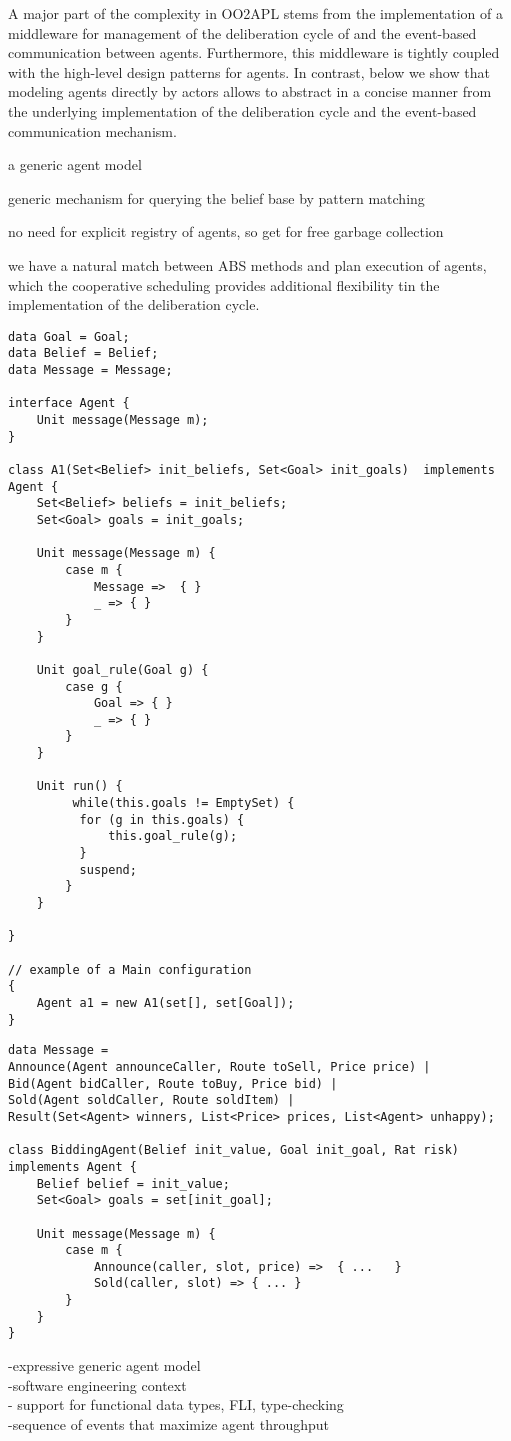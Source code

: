 A major part of the complexity in OO2APL stems from the implementation of a middleware for management of the deliberation cycle of and the event-based communication between agents. 
Furthermore, this middleware is tightly coupled with the high-level design patterns for agents.
In contrast, below we show that modeling agents directly by actors  allows to abstract in a concise manner from the underlying implementation of the deliberation cycle  and the event-based communication mechanism.

a generic agent model

generic mechanism for querying the belief base by pattern matching 

no need for explicit registry of agents, so get for free garbage collection

we have a natural match between ABS methods and plan execution of agents, which the cooperative scheduling provides additional flexibility tin the implementation of the deliberation cycle.


\begin{verbatim}
data Goal = Goal;
data Belief = Belief;
data Message = Message;

interface Agent {
	Unit message(Message m);
}

class A1(Set<Belief> init_beliefs, Set<Goal> init_goals)  implements Agent {
	Set<Belief> beliefs = init_beliefs;
	Set<Goal> goals = init_goals;
	
	Unit message(Message m) {
		case m { 
			Message =>  { }
			_ => { }
		}
	}
	
	Unit goal_rule(Goal g) {
		case g {
			Goal => { }
			_ => { }
		}
	}
	
	Unit run() {
		 while(this.goals != EmptySet) {
		  for (g in this.goals) {
		      this.goal_rule(g);
		  }
		  suspend;
		}
	}

}

// example of a Main configuration
{
    Agent a1 = new A1(set[], set[Goal]);
}
\end{verbatim}


\begin{verbatim}
data Message = 
Announce(Agent announceCaller, Route toSell, Price price) | 
Bid(Agent bidCaller, Route toBuy, Price bid) |
Sold(Agent soldCaller, Route soldItem) |
Result(Set<Agent> winners, List<Price> prices, List<Agent> unhappy);

class BiddingAgent(Belief init_value, Goal init_goal, Rat risk) implements Agent {
	Belief belief = init_value;
	Set<Goal> goals = set[init_goal];
	
	Unit message(Message m) {
		case m {
			Announce(caller, slot, price) =>  { ...   } 
		    Sold(caller, slot) => { ... }
		}
	}
}
\end{verbatim}



-expressive generic agent model \\
-software engineering context \\
- support for functional data types, FLI, type-checking\\
-sequence of events that maximize agent throughput\\


